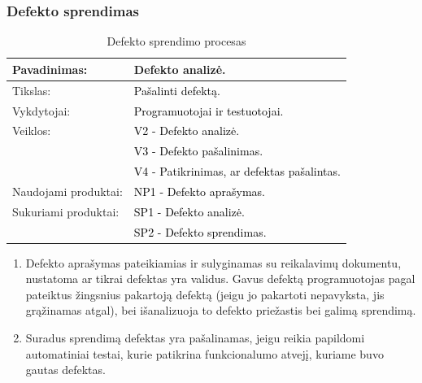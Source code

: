 \documentclass{VUMIFPSkursinis}
\begin{document}
	\newpage

	\subsubsection{Defekto sprendimas}
	\begin{center}
		\begin{table}[ht]
			\caption{Defekto sprendimo procesas}
			\begin{tabular}{ | l | l | }
				\hline
				Pavadinimas:         & Defekto analizė.				\\ \hline
				Tikslas:             & \textcolor{black}{Pašalinti defektą.}				\\ \hline
				Vykdytojai:          & \textcolor{black}{ Programuotojai ir testuotojai.	}	\\ \hline
				Veiklos:             & \textcolor{black}{V2 - Defekto analizė.}				\\
				                     & \textcolor{black}{V3 - Defekto pašalinimas.}			\\
				                     & \textcolor{black}{V4 - Patikrinimas, ar defektas pašalintas.}	\\ \hline
				Naudojami produktai: & \textcolor{black}{NP1 - Defekto aprašymas.}			\\ \hline
				Sukuriami produktai: & \textcolor{black}{SP1 - Defekto analizė.	}		\\
				                     & \textcolor{black}{SP2 - Defekto sprendimas.}			\\ \hline
			\end{tabular}
		\end{table}
	\end{center}
	\begin{enumerate}
		\item{
			Defekto aprašymas pateikiamias ir sulyginamas su reikalavimų dokumentu, nustatoma ar tikrai defektas yra validus.
			Gavus defektą programuotojas pagal pateiktus žingsnius pakartoją defektą (jeigu jo pakartoti nepavyksta, jis grąžinamas atgal), bei išanalizuoja to defekto priežastis bei galimą sprendimą.}
		\item{
			Suradus sprendimą defektas yra pašalinamas, jeigu reikia papildomi automatiniai testai, kurie patikrina funkcionalumo atvejį, kuriame buvo gautas defektas.
		}
	\end{enumerate}
\end{document}
